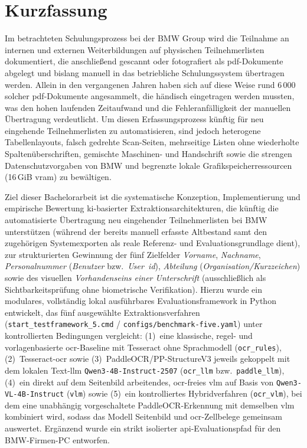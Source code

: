 \chapter{Kurzfassung}

Im betrachteten Schulungsprozess bei der BMW Group wird die Teilnahme an internen und externen Weiterbildungen auf physischen Teilnehmerlisten dokumentiert, die anschließend gescannt oder fotografiert als \ac{pdf}-Dokumente abgelegt und bislang manuell in das betriebliche Schulungssystem übertragen werden. Allein in den vergangenen Jahren haben sich auf diese Weise rund 6\,000 solcher \ac{pdf}-Dokumente angesammelt, die händisch eingetragen werden mussten, was den hohen laufenden Zeitaufwand und die Fehleranfälligkeit der manuellen Übertragung verdeutlicht. Um diesen Erfassungsprozess künftig für neu eingehende Teilnehmerlisten zu automatisieren, sind jedoch heterogene Tabellenlayouts, falsch gedrehte Scan-Seiten, mehrseitige Listen ohne wiederholte Spaltenüberschriften, gemischte Maschinen- und Handschrift sowie die strengen Datenschutzvorgaben von BMW und begrenzte lokale Grafikspeicherressourcen (\mbox{16\,GiB} \ac{vram}) zu bewältigen.

Ziel dieser Bachelorarbeit ist die systematische Konzeption, Implementierung und empirische Bewertung \ac{ki}-basierter Extraktionsarchitekturen, die künftig die automatisierte Übertragung neu eingehender Teilnehmerlisten bei BMW unterstützen (während der bereits manuell erfasste Altbestand samt den zugehörigen Systemexporten als reale Referenz- und Evaluationsgrundlage dient), zur strukturierten Gewinnung der fünf Zielfelder \emph{Vorname}, \emph{Nachname}, \emph{Personalnummer} (\emph{Benutzer} bzw.\ \emph{User~\ac{id}}), \emph{Abteilung} (\emph{Organisation/Kurzzeichen}) sowie des visuellen \emph{Vorhandenseins einer Unterschrift} (ausschließlich als Sichtbarkeitsprüfung ohne biometrische Verifikation). Hierzu wurde ein modulares, vollständig lokal ausführbares Evaluationsframework in Python entwickelt, das fünf ausgewählte Extraktionsverfahren (\texttt{start\_testframework\_5.cmd} / \texttt{configs/benchmark-five.yaml}) unter kontrollierten Bedingungen vergleicht: (1)~eine klassische, regel- und vorlagenbasierte \ac{ocr}-Baseline mit Tesseract ohne Sprachmodell (\texttt{ocr\_rules}), (2)~Tesseract-\acs{ocr} sowie (3)~PaddleOCR/PP-StructureV3 jeweils gekoppelt mit dem lokalen Text-\ac{llm} \texttt{Qwen3-4B-Instruct-2507} (\texttt{ocr\_llm} bzw.\ \texttt{paddle\_llm}), (4)~ein direkt auf dem Seitenbild arbeitendes, \acs{ocr}-freies \ac{vlm} auf Basis von \texttt{Qwen3-VL-4B-Instruct} (\texttt{vlm}) sowie (5)~ein kontrolliertes Hybridverfahren (\texttt{ocr\_vlm}), bei dem eine unabhängig vorgeschaltete PaddleOCR-Erkennung mit demselben \acs{vlm} kombiniert wird, sodass das Modell Seitenbild und \acs{ocr}-Zellbelege gemeinsam auswertet. Ergänzend wurde ein strikt isolierter \ac{api}-Evaluationspfad für den BMW-Firmen-PC entworfen.

